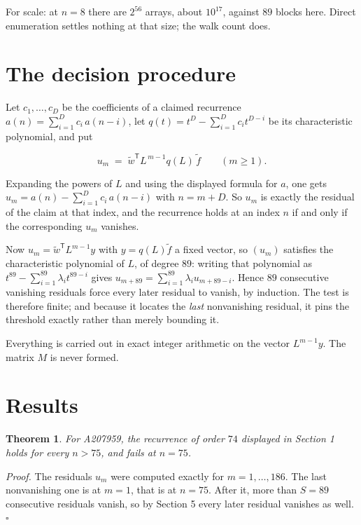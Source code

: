 \documentclass[11pt]{article}
\newtheorem{theorem}{Theorem}
\theoremstyle{definition}
\begin{document}
For scale: at $n = 8$ there are $2^{56}$ arrays, about $10^{17}$, against $89$ blocks here. Direct enumeration settles nothing at that size; the walk count does.

\section{The decision procedure}

Let $c_1,\dots,c_D$ be the coefficients of a claimed recurrence $a(n) = \sum_{i=1}^{D} c_i\,a(n-i)$, let $q(t) = t^{D} - \sum_{i=1}^{D} c_i t^{D-i}$ be its characteristic polynomial, and put

\[u_m \;=\; \tilde w^{\mathsf T} L^{\,m-1} q(L)\,\tilde f \qquad (m \ge 1).\]

Expanding the powers of $L$ and using the displayed formula for $a$, one gets $u_m = a(n) - \sum_{i=1}^{D} c_i\,a(n-i)$ with $n = m + D$. So $u_m$ is exactly the residual of the claim at that index, and the recurrence holds at an index $n$ if and only if the corresponding $u_m$ vanishes.

Now $u_m = \tilde w^{\mathsf T} L^{m-1} y$ with $y = q(L)\tilde f$ a fixed vector, so $(u_m)$ satisfies the characteristic polynomial of $L$, of degree $89$: writing that polynomial as $t^{89} - \sum_{i=1}^{89} \lambda_i t^{89-i}$ gives $u_{m+89} = \sum_{i=1}^{89} \lambda_i u_{m+89-i}$. Hence $89$ consecutive vanishing residuals force every later residual to vanish, by induction. The test is therefore finite; and because it locates the {\itshape last} nonvanishing residual, it pins the threshold exactly rather than merely bounding it.

Everything is carried out in exact integer arithmetic on the vector $L^{m-1}y$. The matrix $M$ is never formed.

\section{Results}

\begin{theorem} For A207959, the recurrence of order $74$ displayed in Section 1 holds for every $n > 75$, and fails at $n = 75$.\end{theorem}

{\itshape Proof.} The residuals $u_m$ were computed exactly for $m = 1,\dots,186$. The last nonvanishing one is at $m = 1$, that is at $n = 75$. After it, more than $S = 89$ consecutive residuals vanish, so by Section 5 every later residual vanishes as well. $\square$
\end{document}
